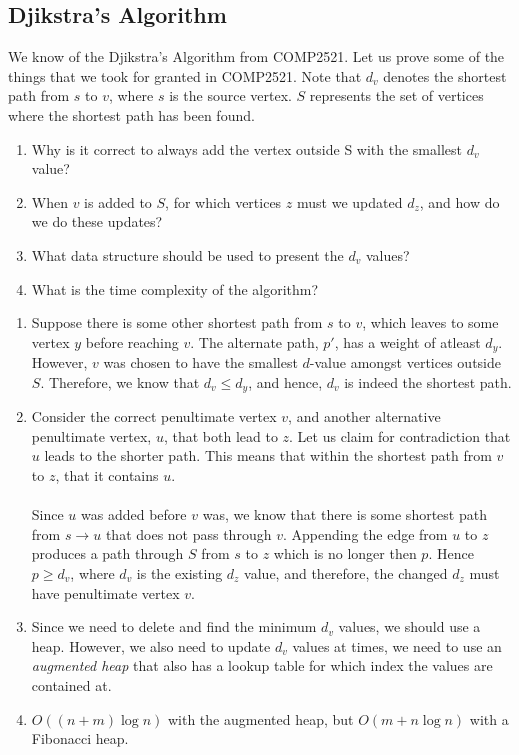 \documentclass[journal, letterpaper]{IEEEtran}
\begin{document}
  \subsection{Djikstra's Algorithm}
  We know of the Djikstra's Algorithm from COMP2521. Let us prove some of the things that we took for granted in COMP2521. Note
  that $d_v$ denotes the shortest path from $s$ to $v$, where $s$ is the source vertex. $S$ represents the set of vertices
  where the shortest path has been found.
  \begin{enumerate}
    \item Why is it correct to always add the vertex outside S with the smallest $d_v$ value?
    \item When $v$ is added to $S$, for which vertices $z$ must we updated $d_z$, and how do we do these updates?
    \item What data structure should be used to present the $d_v$ values?
    \item What is the time complexity of the algorithm?
  \end{enumerate}
  \newpage 
  \begin{enumerate}
    \item Suppose there is some other shortest path from $s$ to $v$, which leaves to some vertex $y$ before reaching $v$.
      The alternate path, $p'$, has a weight of atleast $d_y$. However, $v$ was chosen to have the smallest $d$-value amongst
      vertices outside $S$. Therefore, we know that $d_v \le d_y$, and hence, $d_v$ is indeed the shortest path. \\ 
    \item Consider the correct penultimate vertex $v$, and another alternative penultimate vertex, $u$, that both lead
      to $z$. Let us claim for contradiction that $u$ leads to the shorter path. This means that within the shortest
      path from $v$ to $z$, that it contains $u$. \\ \\Since $u$ was added before $v$ was, we know that there is some
      shortest path from $s \to u$ that does not pass through $v$. Appending the edge from $u$ to $z$ produces
      a path through $S$ from $s$ to $z$ which is no longer then $p$. Hence $p \ge d_v$, where $d_v$ is the existing
      $d_z$ value, and therefore, the changed $d_z$ must have penultimate vertex $v$. \\ 
    \item Since we need to delete and find the minimum $d_v$ values, we should use a heap. However, we also need
      to update $d_v$ values at times, we need to use an \emph{augmented heap} that also has a lookup table for
      which index the values are contained at. \\ 
  \item $O((n+m)\log n)$ with the augmented heap, but $O(m + n\log n)$ with a Fibonacci heap.
  \end{enumerate}
\end{document}

